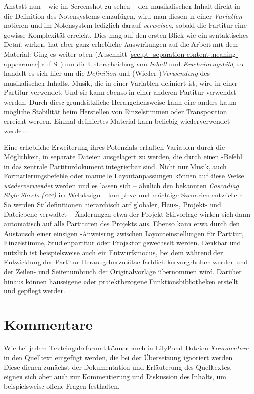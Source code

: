 \documentclass[DIV=12]{scrreprt}
\begin{document}
Anstatt nun -- wie im Screenshot zu sehen -- den musikalischen Inhalt direkt in die Definition des Notensystems einzufügen, wird man diesen in einer \emph{Variablen} notieren und im Notensystem lediglich darauf \emph{verweisen}, sobald die Partitur eine gewisse Komplexität erreicht.
Dies mag auf den ersten Blick wie ein syntaktisches Detail wirken, hat aber ganz erhebliche Auswirkungen auf die Arbeit mit dem Material:
Ging es weiter oben (Abschnitt \ref{sec:pt_separation-content-meaning-appearance} auf S.\,\pageref{sec:pt_separation-content-meaning-appearance}) um die Unterscheidung von \emph{Inhalt} und \emph{Erscheinungsbild}, so handelt es sich hier um die \emph{Definition} und (Wieder-)\emph{Verwendung} des musikalischen Inhalts.
Musik, die in einer Variablen definiert ist, wird in einer Partitur verwendet.
Und sie kann ebenso in einer anderen Partitur verwendet werden.
Durch diese grundsätzliche Herangehensweise kann eine anders kaum mögliche Stabilität beim Herstellen von Einzelstimmen oder Transposition erreicht werden.
Einmal definiertes Material kann beliebig wiederverwendet werden.

\medskip
Eine erhebliche Erweiterung ihres Potenzials erhalten Variablen durch die Möglichkeit, in separate Dateien ausgelagert zu werden, die durch einen -Befehl in das zentrale Partiturdokument integrierbar sind.
Nicht nur Musik, auch Formatierungsbefehle oder manuelle Layoutanpassungen können auf diese Weise \emph{wiederverwendet} werden und es lassen sich -- ähnlich den bekannten \emph{Cascading Style Sheets (\textsc{css})} im Webdesign -- komplexe und mächtige Szenarien entwickeln.
So werden Stildefinitionen hierarchisch auf globaler, Haus-, Projekt- und Dateiebene verwaltet -- Änderungen etwa der Projekt-Stilvorlage wirken sich dann automatisch auf alle Partituren des Projekts aus.
Ebenso kann etwa durch den Austausch einer einzigen -Anweisung zwischen Layouteinstellungen für Partitur, Einzelstimme, Studienpartitur oder Projektor gewechselt werden.
Denkbar und nützlich ist beispielsweise auch ein Entwurfsmodus, bei dem während der Entwicklung der Partitur Herausgeberzusätze farblich hervorgehoben werden und der Zeilen- und Seitenumbruch der Originalvorlage übernommen wird.
Darüber hinaus können hauseigene oder projektbezogene Funktionsbibliotheken erstellt und gepflegt werden.

\section{Kommentare}
\label{sec:pt_lilypond-comments}
Wie bei jedem Texteingabeformat können auch in LilyPond-Dateien \emph{Kommentare} in den Quelltext eingefügt werden, die bei der Übersetzung ignoriert werden.
Diese dienen zunächst der Dokumentation und Erläuterung des Quelltextes, eignen sich aber auch zur Kommentierung und Diskussion des Inhalts, um beispielsweise offene Fragen festhalten.
\end{document}
